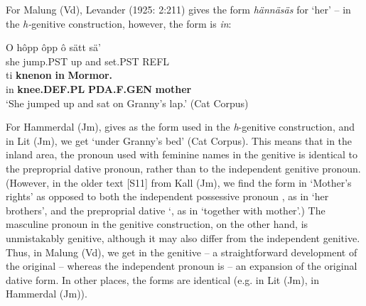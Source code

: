 \z 
\z

For Malung (Vd), Levander (1925: 2:211) gives the form \textit{hännäsäs} for ‘her’ – in the \textit{h-}genitive construction, however, the form is \textit{in}: 


\ea\label{}
\gll O  hôpp  ôpp  ô  sätt  sä’  \\
she  jump.PST  up  and  set.PST  REFL  \\
\gll ti  \textbf{knenon} \textbf{in} \textbf{Mormor.}\\
in  \textbf{knee.DEF.PL} \textbf{PDA.F.GEN} \textbf{mother}\\
\glt ‘She jumped up and sat on Granny’s lap.’ (Cat Corpus)
\z

For Hammerdal (Jm), \citet{Reinhammar2005} gives  as the form used in the \textit{h}{}-genitive construction, and in Lit (Jm), we get  ‘under Granny’s bed’ (Cat Corpus). This means that in the inland area, the pronoun used with feminine names in the genitive is identical to the preproprial dative pronoun, rather than to the independent genitive pronoun. (However, in the older text [S11] from Kall (Jm), we find the form  in  ‘Mother’s rights’ as opposed to both the independent possessive pronoun , as in  ‘her brothers’, and the preproprial dative ‘, as in  ‘together with mother’.) The masculine pronoun in the genitive construction, on the other hand, is unmistakably genitive, although it may also differ from the independent genitive. Thus, in Malung (Vd), we get  in the genitive – a straightforward development of the original  – whereas the independent pronoun is  – an expansion of the original dative form. In other places, the forms are identical (e.g.  in Lit (Jm),  in Hammerdal (Jm)). 

